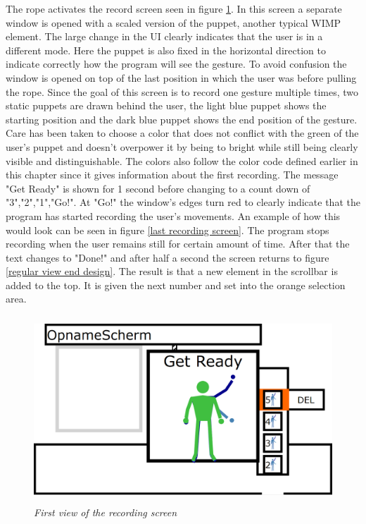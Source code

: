 The rope activates the record screen seen in figure \ref{first recording screen}. In this screen a separate window is opened with a scaled version of the puppet, another typical WIMP element. The large change in the UI clearly indicates that the user is in a different mode. Here the puppet is also fixed in the horizontal direction to indicate correctly how the program will see the gesture. To avoid confusion the window is opened on top of the last position in which the user was before pulling the rope. Since the goal of this screen is to record one gesture multiple times, two static puppets are drawn behind the user, the light blue puppet shows the starting position and the dark blue puppet shows the end position of the gesture. Care has been taken to choose a color that does not conflict with the green of the user's puppet and doesn't overpower it by being to bright while still being clearly visible and distinguishable. The colors also follow the color code defined earlier in this chapter since it gives information about the first recording. The message "Get Ready" is shown for 1 second before changing to a count down of "3","2","1","Go!". At "Go!" the window's edges turn red to clearly indicate that the program has started recording the user's movements. An example of how this would look can be seen in figure \ref{last recording screen}. The program stops recording when the user remains still for certain amount of time. After that the text changes to "Done!" and after half a second the screen returns to figure  \ref{regular view end design}. The result is that a new element in the scrollbar is added to the top. It is given the next number and set into the orange selection area.\\

\begin{figure}[H]
	\begin{center}
		\includegraphics[width=12.5cm, height=7cm]{figures/4_record_getready.png}
		\caption{\emph{First view of the recording screen}}
		\label{first recording screen}
	\end{center}
\end{figure}

